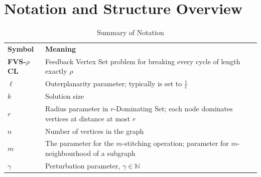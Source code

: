\section*{Notation and Structure Overview}

\begin{table}[h]
    \centering
    \begin{tabular}{ll}
    \textbf{Symbol} & \textbf{Meaning} \\
    \textbf{FVS-$\rho$CL} & Feedback Vertex Set problem for breaking every cycle of length exactly $\rho$ \\
    $\ell$ & Outerplanarity parameter; typically is set to $\frac{1}{\epsilon}$ \\
    $k$ & Solution size \\
    $r$ & Radius parameter in $r$-Dominating Set; each node dominates vertices at distance at most $r$ \\
    $n$ & Number of vertices in the graph \\
    $m$ & The parameter for the $m$-stitching operation; parameter for $m$-neighbourhood of a subgraph \\
    $\gamma$ & Perturbation parameter, $\gamma \in \mathbb{N}$ \\
    \end{tabular}
    \caption{Summary of Notation}
    \label{tab:notation}
\end{table}
    

